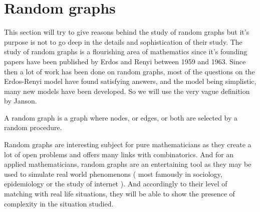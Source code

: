 \section{Random graphs}
This section will try to give reasons behind the study of random graphs but it's purpose is not to go deep in the details and sophistication of their study.
The study of random graphs is a flourishing area of mathematics since it's founding papers have been published by Erdos and Renyi between 1959 and 1963. Since then a lot of work has been done on random graphs, most of the questions on the Erdos-Renyi model have found satisfying answers, and the model being simplistic, many new models have been developed.
So we will use the very vague definition by Janson.
\begin{definition} A random graph is a graph where nodes, or edges, or both are selected by a random procedure.
\end{definition}
Random graphs are interesting subject for pure mathematicians as they create a lot of open problems and offers many links with combinatorics. And for an applied mathematicians, random graphs are an entertaining tool as they may be used to simulate real world phenomenons ( most famously in sociology, epidemiology or the study of internet ). And accordingly to their level of matching with real life situations, they will be able to show the presence of complexity in the situation studied.
